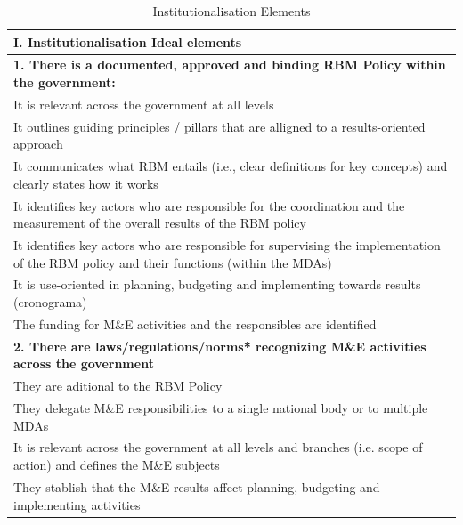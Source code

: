\documentclass[
  10pt,
]{book}
\begin{document}
\begin{table}

\caption{\label{tab:unnamed-chunk-2}Institutionalisation Elements}
\centering
\begin{tabular}[t]{l}
\hline
I. Institutionalisation Ideal elements\\
\hline
\multicolumn{1}{l}{\textbf{1. There is a documented, approved and binding RBM Policy within the government:}}\\
\hline
\hspace{1em}It is relevant across the government at all levels\\
\hline
\hspace{1em}It outlines guiding principles / pillars that are alligned to a results-oriented approach\\
\hline
\hspace{1em}It communicates what RBM entails (i.e., clear definitions for key concepts) and clearly states how it works\\
\hline
\hspace{1em}It identifies key actors who are responsible for the coordination and the measurement of the overall results of the RBM policy\\
\hline
\hspace{1em}It identifies key actors who are responsible for supervising the implementation of the RBM policy and their functions (within the MDAs)\\
\hline
\hspace{1em}It is use-oriented in planning, budgeting and implementing towards results (cronograma)\\
\hline
\hspace{1em}The funding for M\&E activities and the responsibles are identified\\
\hline
\multicolumn{1}{l}{\textbf{2. There are laws/regulations/norms* recognizing M\&E activities across the government}}\\
\hline
\hspace{1em}They are aditional to the RBM Policy\\
\hline
\hspace{1em}They delegate M\&E responsibilities to a single national body or to multiple MDAs\\
\hline
\hspace{1em}It is relevant across the government at all levels and branches (i.e. scope of action) and defines the M\&E subjects\\
\hline
\hspace{1em}They stablish that the M\&E results affect planning, budgeting and implementing activities\\

\end{tabular}
\end{table}
\end{document}
